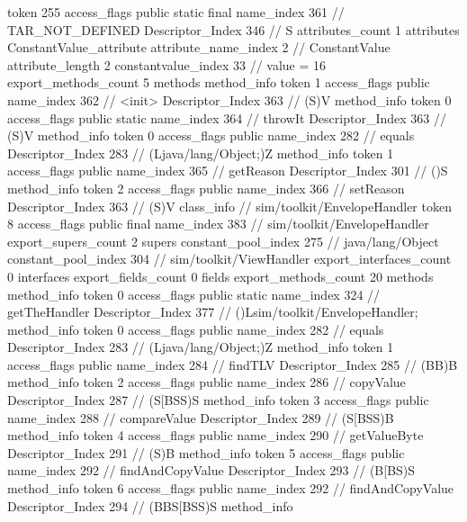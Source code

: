 {{{{{				token	255
				access_flags	public static final
				name_index	361		// TAR_NOT_DEFINED
				Descriptor_Index	346		// S
				attributes_count	1
				attributes {
				ConstantValue_attribute {
					attribute_name_index	2		// ConstantValue
					attribute_length	2
					constantvalue_index	33		// value = 16
				}
				}
			}
			}
			export_methods_count	5
			methods {
				method_info {
					token	1
					access_flags	public
					name_index	362		// <init>
					Descriptor_Index	363		// (S)V
				}
				method_info {
					token	0
					access_flags	public static
					name_index	364		// throwIt
					Descriptor_Index	363		// (S)V
				}
				method_info {
					token	0
					access_flags	public
					name_index	282		// equals
					Descriptor_Index	283		// (Ljava/lang/Object;)Z
				}
				method_info {
					token	1
					access_flags	public
					name_index	365		// getReason
					Descriptor_Index	301		// ()S
				}
				method_info {
					token	2
					access_flags	public
					name_index	366		// setReason
					Descriptor_Index	363		// (S)V
				}
			}
		}
		class_info {		// sim/toolkit/EnvelopeHandler
			token	8
			access_flags	public final
			name_index	383		// sim/toolkit/EnvelopeHandler
			export_supers_count	2
			supers {
				constant_pool_index	275		// java/lang/Object
				constant_pool_index	304		// sim/toolkit/ViewHandler
			}
			export_interfaces_count	0
			interfaces {
			}
			export_fields_count	0
			fields {
			}
			export_methods_count	20
			methods {
				method_info {
					token	0
					access_flags	public static
					name_index	324		// getTheHandler
					Descriptor_Index	377		// ()Lsim/toolkit/EnvelopeHandler;
				}
				method_info {
					token	0
					access_flags	public
					name_index	282		// equals
					Descriptor_Index	283		// (Ljava/lang/Object;)Z
				}
				method_info {
					token	1
					access_flags	public
					name_index	284		// findTLV
					Descriptor_Index	285		// (BB)B
				}
				method_info {
					token	2
					access_flags	public
					name_index	286		// copyValue
					Descriptor_Index	287		// (S[BSS)S
				}
				method_info {
					token	3
					access_flags	public
					name_index	288		// compareValue
					Descriptor_Index	289		// (S[BSS)B
				}
				method_info {
					token	4
					access_flags	public
					name_index	290		// getValueByte
					Descriptor_Index	291		// (S)B
				}
				method_info {
					token	5
					access_flags	public
					name_index	292		// findAndCopyValue
					Descriptor_Index	293		// (B[BS)S
				}
				method_info {
					token	6
					access_flags	public
					name_index	292		// findAndCopyValue
					Descriptor_Index	294		// (BBS[BSS)S
				}
				method_info {
}}}}}
